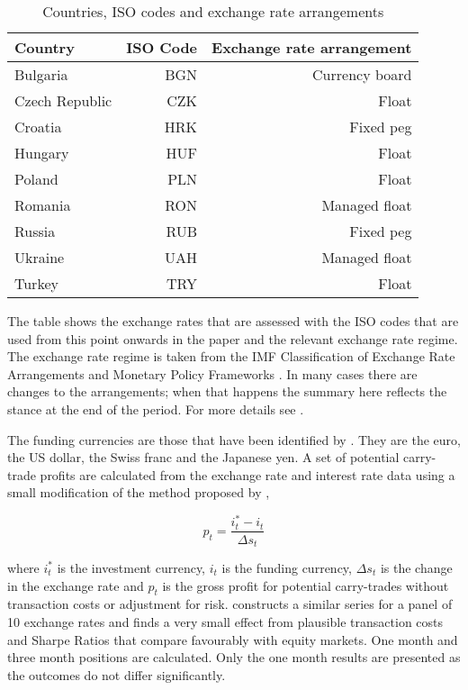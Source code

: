 \documentclass[12pt, a4paper, oneside]{article}\usepackage[]{graphicx}\usepackage[]{color}
\begin{document}
\begin{table}[t]
\begin{threeparttable}
\centering
\begin{tabular}{p{5.7cm}rr}
  \hline
Country & ISO Code & Exchange rate arrangement\\
  \hline
Bulgaria & BGN & Currency board\\
Czech Republic & CZK & Float\\
Croatia & HRK & Fixed peg\\
Hungary & HUF & Float \\
Poland & PLN & Float\\
Romania & RON & Managed float\\
Russia & RUB & Fixed peg\\
Ukraine & UAH & Managed float\\
Turkey & TRY & Float\\
   \hline
\end{tabular}
\begin{tablenotes}
\small
\item The table shows the exchange rates that are assessed with the ISO codes that are used from this point onwards in the paper and the relevant exchange rate regime.  The exchange rate regime is taken from the IMF Classification of Exchange Rate Arrangements and Monetary Policy Frameworks \citet{IMFregime}. In many cases there are changes to the arrangements; when that happens the summary here reflects the stance at the end of the period.  For more details see \citet{Hayward2014}.  
\end{tablenotes}
\caption{Countries, ISO codes and exchange rate arrangements}
\label{tabref:exrate}
\end{threeparttable}
\end{table}

The funding currencies are those that have been identified by \citet{FTS}. They are the euro, the US dollar, the Swiss franc and the Japanese yen. A set of potential carry-trade profits are calculated from the exchange rate and interest rate data using a small modification of the method proposed by \citet{BrunnermeierCarry},   

\begin{equation}
p_t = \frac{i^*_t - i_t}{\Delta s_t}
\end{equation} 

where $i_t^*$ is the investment currency, $i_t$ is the funding currency, $\Delta s_t$ is the change in the exchange rate and $p_t$ is the gross profit for potential carry-trades without transaction costs or adjustment for risk.  \citet{Burnside2010} constructs a similar series for a panel of 10 exchange rates and finds a very small effect from plausible transaction costs and Sharpe Ratios that compare favourably with equity markets.  One month and three month positions are calculated. Only the one month results are presented as the outcomes do not differ significantly. 
\end{document}
